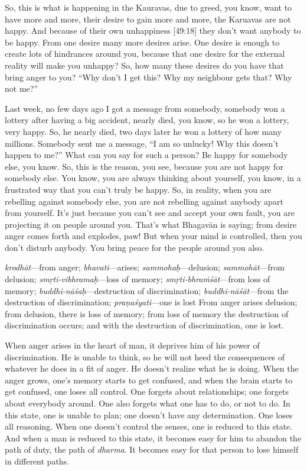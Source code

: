 So, this is what is happening in the Kauravas, due to greed, you know, want to have more and more, their desire to gain more and more, the Karuavas are not happy. And because of their own unhappiness [49:18] they don’t want anybody to be happy. From one desire many more desires arise. One desire is enough to create lots of hindrances around you, because that one desire for the external reality will make you unhappy? So, how many these desires do you have that bring anger to you? “Why don’t I get this? Why my neighbour gets that? Why not me?”

Last week, no few days ago I got a message from somebody, somebody won a lottery after having a big accident, nearly died, you know, so he won a lottery, very happy. So, he nearly died, two days later he won a lottery of how many millions. Somebody sent me a message, “I am so unlucky! Why this doesn’t happen to me?” What can you say for such a person? Be happy for somebody else, you know. So, this is the reason, you see, because you are not happy for somebody else. You know, you are always thinking about yourself, you know, in a frustrated way that you can’t truly be happy. So, in reality, when you are rebelling against somebody else, you are not rebelling against anybody apart from yourself. It’s just because you can’t see and accept your own fault, you are projecting it on people around you. That’s what Bhagavān is saying; from desire anger comes forth and explodes, paw! But when your mind is controlled, then you don’t disturb anybody. You bring peace for the people around you also.

{%
  \textit{krodhāt}---from anger; 
  \textit{bhavati}---arises; 
  \textit{sammohaḥ}---delusion; 
  \textit{sammohāt}---from delusion; 
  \textit{smṛti-vibhramaḥ}---loss of memory; 
  \textit{smṛti-bhraṁśāt}---from loss of memory; 
  \textit{buddhi-nāśaḥ}---destruction of discrimination; 
  \textit{buddhi-nāśāt}---from the destruction of discrimination; 
  \textit{praṇaśyati}---one is lost
}
{%
  From anger arises delusion; from delusion, there is loss of memory; from loss of memory the destruction of discrimination occurs; and with the destruction of discrimination, one is lost.
}

When anger arises in the heart of man, it deprives him of his power of discrimination. He is unable to think, so he will not heed the consequences of whatever he does in a fit of anger. He doesn’t realize what he is doing. When the anger grows, one’s memory starts to get confused, and when the brain starts to get confused, one loses all control. One forgets about relationships; one forgets about everybody around. One also forgets what one has to do, or not to do. In this state, one is unable to plan; one doesn’t have any determination. One loses all reasoning. When one doesn’t control the senses, one is reduced to this state. And when a man is reduced to this state, it becomes easy for him to abandon the path of duty, the path of \textit{dharma}. It becomes easy for that person to lose himself in different paths.

